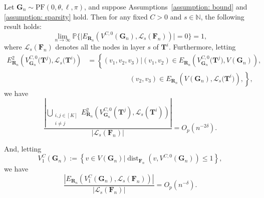 \documentclass[twoside,11pt]{article}
\theoremstyle{remark}
\begin{document}
\begin{lemma}
\label{lemma layer noise}
Let $\boldsymbol{G}_n \sim \mathrm{PF}(0, \theta ,\ell, \pi)$, and suppose Assumptions~\ref{assumption: bound} and \ref{assumption: sparsity} hold. Then for any fixed $C > 0$ and $s\in \mathbb{N}$, the following result holds:
%
\begin{equation}
\label{lemma layer noise eqn 1}
     \lim_{n \rightarrow \infty} \mathbb{P}\bigl\{\bigl|E_{\boldsymbol{R}_n}(V^{C,0}(\boldsymbol{G}_n), \mathcal{L}_s(\boldsymbol{F}_n))\bigr|=0\bigr\}=1,
\end{equation}
%
where $\mathcal{L}_s\left(\boldsymbol{F}_n\right)$ denotes all the nodes in layer $s$ of $\boldsymbol{T}^i$.
Furthermore, letting
%
\begin{align}
\label{lemma layer noise chain}
\nonumber
E^2_{\boldsymbol{R}_n}  \left(V^{C,0}_{\boldsymbol{G}_n}\bigl(\boldsymbol{T}^j\bigr), \mathcal{L}_s\bigl(\boldsymbol{T}^i\bigr)\right)&=\left\{\left(v_1, v_2, v_3\right)\bigg| \left(v_1, v_2\right)\in E_{\boldsymbol{R}_n}\left(V^{C,0}_{\boldsymbol{G}_n}\bigl(\boldsymbol{T}^j\bigr), V\left(\boldsymbol{G}_n\right)\right), \right. \\
& \qquad \qquad \qquad
\left. \left(v_2, v_3\right)\in E_{\boldsymbol{R}_n}\left(V\left(\boldsymbol{G}_n\right), \mathcal{L}_s\bigl(\boldsymbol{T}^i\bigr)\right), \right\}, 
\end{align}
%
we have
%
\begin{equation}
\label{lemma layer noise eqn 2}
\frac{\left|\bigcup_{\substack{i,j\in[K]\\ i\neq j}} E^2_{\boldsymbol{R}_n}\left(V^{C,0}_{\boldsymbol{G}_n}\left(\boldsymbol{T}^j\right), \mathcal{L}_s\left(\boldsymbol{T}^{i}\right)\right)\right|}{\left| \mathcal{L}_s\left(\boldsymbol{F}_n\right)\right|}= O_p\left(n^{-2\delta}\right).  
\end{equation}
%

And, letting
%
\begin{equation}
\label{lemma layer noise eqn 3}
V_1^C\left(\boldsymbol{G}_n\right):=\left\{ v\in V\left(\boldsymbol{G}_n\right) \bigg| \operatorname{dist}_{\bm{F}_n}\left(v, V^{C,0}\left(\boldsymbol{G}_n\right)\right)\le 1\right\},    
\end{equation}
%
we have
%
\begin{equation}
\label{lemma layer noise eqn 4}
\frac{\left|E_{\boldsymbol{R}_n}\left(V_1^C\left(\boldsymbol{G}_n\right), \mathcal{L}_s\left(\boldsymbol{F}_n\right)\right)\right|}{\left| \mathcal{L}_s\left(\boldsymbol{F}_n\right)\right|}= O_p\left(n^{-\delta}\right).  
\end{equation}
%
\end{lemma}
\end{document}
